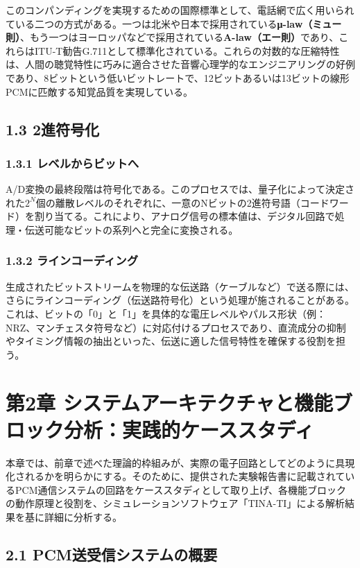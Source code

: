 \documentclass[
  a4paper,  %
  11pt,     %
]{ltjsarticle}%
\begin{document}
このコンパンディングを実現するための国際標準として、電話網で広く用いられている二つの方式がある。一つは北米や日本で採用されている\textbf{μ-law（ミュー則）}、もう一つはヨーロッパなどで採用されている\textbf{A-law（エー則）}であり、これらはITU-T勧告G.711として標準化されている\cite{ref11}。これらの対数的な圧縮特性は、人間の聴覚特性に巧みに適合させた音響心理学的なエンジニアリングの好例であり、8ビットという低いビットレートで、12ビットあるいは13ビットの線形PCMに匹敵する知覚品質を実現している。

\subsection{1.3 2進符号化}

\subsubsection{1.3.1 レベルからビットへ}

A/D変換の最終段階は符号化である。このプロセスでは、量子化によって決定された$2^N$個の離散レベルのそれぞれに、一意のNビットの2進符号語（コードワード）を割り当てる。これにより、アナログ信号の標本値は、デジタル回路で処理・伝送可能なビットの系列へと完全に変換される。

\subsubsection{1.3.2 ラインコーディング}

生成されたビットストリームを物理的な伝送路（ケーブルなど）で送る際には、さらにラインコーディング（伝送路符号化）という処理が施されることがある。これは、ビットの「0」と「1」を具体的な電圧レベルやパルス形状（例：NRZ、マンチェスタ符号など）に対応付けるプロセスであり、直流成分の抑制やタイミング情報の抽出といった、伝送に適した信号特性を確保する役割を担う。

\section{第2章 システムアーキテクチャと機能ブロック分析：実践的ケーススタディ}

本章では、前章で述べた理論的枠組みが、実際の電子回路としてどのように具現化されるかを明らかにする。そのために、提供された実験報告書\cite{ref1}に記載されているPCM通信システムの回路をケーススタディとして取り上げ、各機能ブロックの動作原理と役割を、シミュレーションソフトウェア「TINA-TI」\cite{ref14}による解析結果を基に詳細に分析する。

\subsection{2.1 PCM送受信システムの概要}
\end{document}

